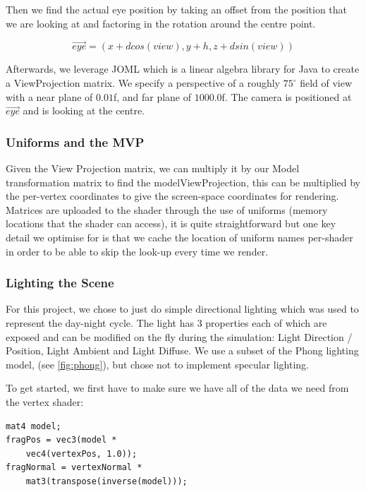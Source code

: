 \documentclass{article}
\begin{document}
\begin{multicols}{2}
                    Then we find the actual eye position by taking an offset from the position that we are looking at and factoring in the rotation around the centre point.

                    \[
                        \vec{eye} = (x + d cos(view), y + h, z + d sin(view))
                    \]

                    Afterwards, we leverage JOML \cite{JOML} which is a linear algebra library for Java to create a ViewProjection matrix. We specify a perspective of a roughly $ 75^\circ $ field of view with a near plane of $ 0.01 $f, and far plane of $ 1000.0 $f. The camera is positioned at $ \vec{eye} $ and is looking at the centre.

                \subsubsection{Uniforms and the MVP}

                    Given the View Projection matrix, we can multiply it by our Model transformation matrix to find the modelViewProjection, this can be multiplied by the per-vertex coordinates to give the screen-space coordinates for rendering.
                    Matrices are uploaded to the shader through the use of uniforms (memory locations that the shader can access), it is quite straightforward but one key detail we optimise for is that we cache the location of uniform names per-shader in order to be able to skip the look-up every time we render.

                \subsubsection{Lighting the Scene}

                    For this project, we chose to just do simple directional lighting which was used to represent the day-night cycle. The light has 3 properties each of which are exposed and can be modified on the fly during the simulation: Light Direction / Position, Light Ambient and Light Diffuse. We use a subset of the Phong lighting model, (see \autoref{fig:phong}), but chose not to implement specular lighting.
    
                    To get started, we first have to make sure we have all of the data we need from the vertex shader:
                    
                    \begin{lstlisting}
mat4 model;
fragPos = vec3(model *
    vec4(vertexPos, 1.0));
fragNormal = vertexNormal *
    mat3(transpose(inverse(model)));\end{lstlisting}


\end{multicols}
\end{document}

